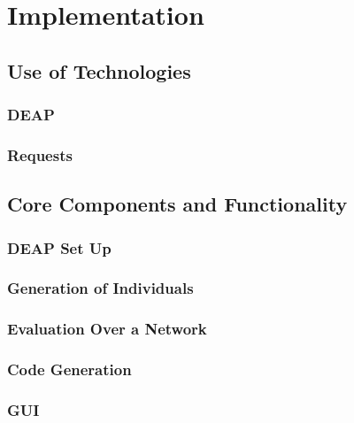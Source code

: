 \documentclass{l4proj}
\begin{document}
\chapter{Implementation}


\section{Use of Technologies}

\subsection{DEAP}


\subsection{Requests}


\section{Core Components and Functionality}

\subsection{DEAP Set Up}


\subsection{Generation of Individuals}


\subsection{Evaluation Over a Network}


\subsection{Code Generation}


\subsection{GUI}

\end{document}
